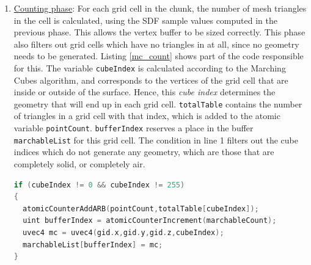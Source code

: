 \documentclass{article}
\begin{document}
\begin{enumerate}
\item \underline{Counting phase}: For each grid cell in the chunk, the number of mesh triangles in the cell is calculated, using the SDF sample values computed in the previous phase. This allows the vertex buffer to be sized correctly. This phase also filters out grid cells which have no triangles in at all, since no geometry needs to be generated. Listing \ref{mc_count} shows part of the code responsible for this. The variable \texttt{cubeIndex} is calculated according to the Marching Cubes algorithm, and corresponds to the vertices of the grid cell that are inside or outside of the surface. Hence, this \textit{cube index} determines the geometry that will end up in each grid cell. \texttt{totalTable} contains the number of triangles in a grid cell with that index, which is added to the atomic variable \texttt{pointCount}. \texttt{bufferIndex} reserves a place in the buffer \texttt{marchableList} for this grid cell. The condition in line 1 filters out the cube indices which do not generate any geometry, which are those that are completely solid, or completely air.
\begin{lstlisting}[language=C++,label={mc_count},caption={GLSL code for counting the number of vertices and marchable grid cells in the chunk. When \texttt{cubeIndex} is equal to either 0 or 255, no geometry is generated in that cell.}]
if (cubeIndex != 0 && cubeIndex != 255)
{
  atomicCounterAddARB(pointCount,totalTable[cubeIndex]);
  uint bufferIndex = atomicCounterIncrement(marchableCount);
  uvec4 mc = uvec4(gid.x,gid.y,gid.z,cubeIndex);
  marchableList[bufferIndex] = mc;
}
\end{lstlisting}


\end{enumerate}
\end{document}
